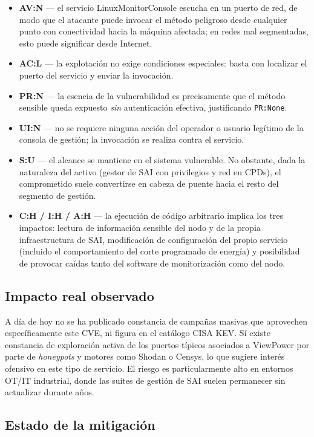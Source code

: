 \begin{itemize}[leftmargin=*]
    \item \textbf{AV:N} --- el servicio LinuxMonitorConsole escucha en un puerto de red, de modo que el atacante puede invocar el método peligroso desde cualquier punto con conectividad hacia la máquina afectada; en redes mal segmentadas, esto puede significar desde Internet.
    \item \textbf{AC:L} --- la explotación no exige condiciones especiales: basta con localizar el puerto del servicio y enviar la invocación.
    \item \textbf{PR:N} --- la esencia de la vulnerabilidad es precisamente que el método sensible queda expuesto \textit{sin} autenticación efectiva, justificando \texttt{PR:None}.
    \item \textbf{UI:N} --- no se requiere ninguna acción del operador o usuario legítimo de la consola de gestión; la invocación se realiza contra el servicio.
    \item \textbf{S:U} --- el alcance se mantiene en el sistema vulnerable. No obstante, dada la naturaleza del activo (gestor de SAI con privilegios y red en CPDs), el comprometido suele convertirse en cabeza de puente hacia el resto del segmento de gestión.
    \item \textbf{C:H / I:H / A:H} --- la ejecución de código arbitrario implica los tres impactos: lectura de información sensible del nodo y de la propia infraestructura de SAI, modificación de configuración del propio servicio (incluido el comportamiento del corte programado de energía) y posibilidad de provocar caídas tanto del software de monitorización como del nodo.
\end{itemize}

\subsection*{Impacto real observado}

A día de hoy no se ha publicado constancia de campañas masivas que aprovechen específicamente este CVE, ni figura en el catálogo CISA KEV. Sí existe constancia de exploración activa de los puertos típicos asociados a ViewPower por parte de \textit{honeypots} y motores como Shodan o Censys, lo que sugiere interés ofensivo en este tipo de servicio. El riesgo es particularmente alto en entornos OT/IT industrial, donde las suites de gestión de SAI suelen permanecer sin actualizar durante años.

\subsection*{Estado de la mitigación}


